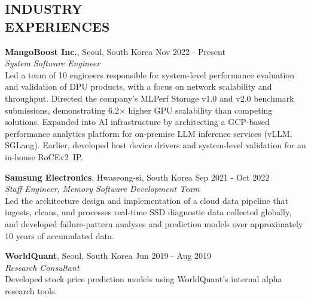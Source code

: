 \documentclass[margin]{res}
\begin{document}
\begin{resume}


\section{INDUSTRY \\ EXPERIENCES}
\par
\textbf{MangoBoost Inc.}, Seoul, South Korea \hfill Nov 2022 - Present \\
\textit{System Software Engineer} \\
Led a team of 10 engineers responsible for system-level performance evaluation
and validation of DPU products, with a focus on network scalability and
throughput.
Directed the company's MLPerf Storage v1.0 and v2.0 benchmark submissions,
demonstrating 6.2$\times$ higher GPU scalability than competing solutions.
Expanded into AI infrastructure by architecting a GCP-based performance
analytics platform for on-premise LLM inference services (vLLM, SGLang).
Earlier, developed host device drivers and system-level validation for an
in-house RoCEv2~IP.

\vspace{-0.5em}
\par
\textbf{Samsung Electronics}, Hwaseong-si, South Korea \hfill Sep 2021 - Oct 2022 \\
\textit{Staff Engineer, Memory Software Development Team} \\
Led the architecture design and implementation of a cloud data pipeline that
ingests, cleans, and processes real-time SSD diagnostic data collected globally,
and developed failure-pattern analyses and prediction models over approximately
10 years of accumulated data.

\vspace{-0.5em}
\par
\textbf{WorldQuant}, Seoul, South Korea \hfill Jun 2019 - Aug 2019 \\
\textit{Research Consultant} \\
Developed stock price prediction models using WorldQuant's internal alpha
research tools.



\end{resume}
\end{document}
